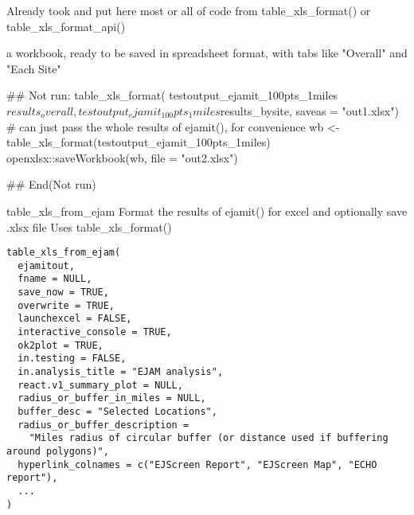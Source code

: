 \documentclass[a4paper]{book}
\begin{document}
%
\begin{Details}\relax
Already took and put here most or all of code from table\_xls\_format() or table\_xls\_format\_api()
\end{Details}
%
\begin{Value}
a workbook, ready to be saved in spreadsheet format, with tabs like "Overall" and "Each Site"
\end{Value}
%
\begin{SeeAlso}\relax
{}
\end{SeeAlso}
%
\begin{Examples}
\begin{ExampleCode}
## Not run: 
  table_xls_format(
    testoutput_ejamit_100pts_1miles$results_overall, 
    testoutput_ejamit_100pts_1miles$results_bysite,
    saveas =  "out1.xlsx")
 # can just pass the whole results of ejamit(), for convenience
 wb <- table_xls_format(testoutput_ejamit_100pts_1miles)
 openxlsx::saveWorkbook(wb, file = "out2.xlsx")

## End(Not run)
\end{ExampleCode}
\end{Examples}
%
\begin{Description}\relax
table\_xls\_from\_ejam
Format the results of ejamit() for excel and optionally save .xlsx file
Uses table\_xls\_format()
\end{Description}
%
\begin{Usage}
\begin{verbatim}
table_xls_from_ejam(
  ejamitout,
  fname = NULL,
  save_now = TRUE,
  overwrite = TRUE,
  launchexcel = FALSE,
  interactive_console = TRUE,
  ok2plot = TRUE,
  in.testing = FALSE,
  in.analysis_title = "EJAM analysis",
  react.v1_summary_plot = NULL,
  radius_or_buffer_in_miles = NULL,
  buffer_desc = "Selected Locations",
  radius_or_buffer_description =
    "Miles radius of circular buffer (or distance used if buffering around polygons)",
  hyperlink_colnames = c("EJScreen Report", "EJScreen Map", "ECHO report"),
  ...
)
\end{verbatim}
\end{Usage}
%
\end{document}
